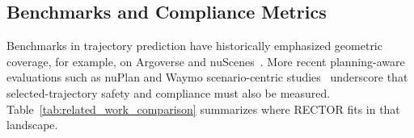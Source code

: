 \subsection{Benchmarks and Compliance Metrics}
\label{subsec:benchmarks_metrics}

Benchmarks in trajectory prediction have historically emphasized geometric coverage, for example, on Argoverse and nuScenes~\cite{chang2019argoverse,caesar2020nuscenes}. More recent planning-aware evaluations such as nuPlan and Waymo scenario-centric studies~\cite{caesar2021nuplan,montali2024waymo} underscore that selected-trajectory safety and compliance must also be measured. Table~\ref{tab:related_work_comparison} summarizes where RECTOR fits in that landscape.

